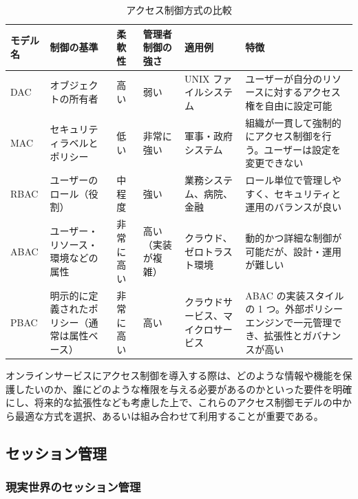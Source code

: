 \documentclass[uplatex]{jsarticle}
\def\label#1{}%
\begin{document}
\begin{table}[H]
\centering
\caption{アクセス制御方式の比較}
\label{tab:ch2b-access-control-models}
\small
\begin{tabularx}{\linewidth}{|l|>{\raggedright\arraybackslash}p{24mm}|>{\raggedright\arraybackslash}p{10mm}|>{\raggedright\arraybackslash}p{15mm}|>{\raggedright\arraybackslash}p{22mm}|>{\raggedright\arraybackslash}X|}
\hline
モデル名 & 制御の基準 & 柔軟性 & 管理者制御の強さ & 適用例 & 特徴 \\
\hline
DAC & オブジェクトの所有者 & 高い & 弱い & UNIX ファイルシステム & ユーザーが自分のリソースに対するアクセス権を自由に設定可能 \\
\hline
MAC & セキュリティラベルとポリシー & 低い & 非常に強い & 軍事・政府システム & 組織が一貫して強制的にアクセス制御を行う。ユーザーは設定を変更できない \\
\hline
RBAC & ユーザーのロール（役割） & 中程度 & 強い & 業務システム、病院、金融 & ロール単位で管理しやすく、セキュリティと運用のバランスが良い \\
\hline
ABAC & ユーザー・リソース・環境などの属性 & 非常に高い & 高い（実装が複雑） & クラウド、ゼロトラスト環境 & 動的かつ詳細な制御が可能だが、設計・運用が難しい \\
\hline
PBAC & 明示的に定義されたポリシー（通常は属性ベース） & 非常に高い & 高い & クラウドサービス、マイクロサービス & ABAC の実装スタイルの 1 つ。外部ポリシーエンジンで一元管理でき、拡張性とガバナンスが高い \\
\hline
\end{tabularx}
\end{table}

\begin{rem}[アクセス制御方式の選択]\label{rem:ch2b-choosing-model}
オンラインサービスにアクセス制御を導入する際は、どのような情報や機能を保護したいのか、誰にどのような権限を与える必要があるのかといった要件を明確にし、将来的な拡張性なども考慮した上で、これらのアクセス制御モデルの中から最適な方式を選択、あるいは組み合わせて利用することが重要である。
\end{rem}

\subsection{セッション管理}\label{subsec:ch2b-session-management}

\subsubsection{現実世界のセッション管理}
\end{document}
